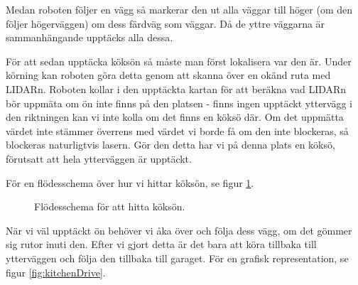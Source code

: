 \documentclass[a4paper,11pt]{article}
\begin{document}
Medan roboten följer en vägg så markerar den ut alla väggar till höger (om den följer högerväggen) om dess färdväg som väggar. Då de yttre väggarna är sammanhängande upptäcks alla dessa.

För att sedan upptäcka köksön så måste man först lokalisera var den är. Under körning kan roboten göra detta genom att skanna över en okänd ruta med LIDARn. Roboten kollar i den upptäckta kartan för att beräkna vad LIDARn bör uppmäta om ön inte finns på den platsen - finns ingen upptäckt yttervägg i den riktningen kan vi inte kolla om det finns en köksö där. Om det uppmätta värdet inte stämmer överrens med värdet vi borde få om den inte blockeras, så blockeras naturligtvis lasern. Gör den detta har vi på denna plats en köksö, förutsatt att hela ytterväggen är upptäckt.

För en flödesschema över hur vi hittar köksön, se figur \ref{fig:kitchenSearch}.

\begin{figure}[h!]
 \caption{Flödesschema för att hitta köksön. \label{fig:kitchenSearch}}
 
\end{figure}

När vi väl upptäckt ön behöver vi åka över och följa dess vägg, om det gömmer sig rutor inuti den. Efter vi gjort detta är det bara att köra tillbaka till ytterväggen och följa den tillbaka till garaget. För en grafisk representation, se figur \ref{fig:kitchenDrive}.
\end{document}
